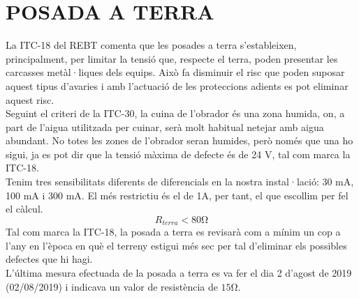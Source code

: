 \chapter{\uppercase{Posada a terra}}
La ITC-18 del REBT comenta que les posades a terra s'estableixen, principalment, per limitar la tensió que, respecte el terra, poden presentar les carcasses metàl·liques dels equips. Això fa disminuir el risc que poden suposar aquest tipus d'avaries i amb l'actuació de les proteccions adients es pot eliminar aquest risc.\\
\newline Seguint el criteri de la ITC-30, la cuina de l'obrador és una zona humida, on, a part de l'aigua utilitzada per cuinar, serà molt habitual netejar amb aigua abundant. No totes les zones de l'obrador seran humides, però només que una ho sigui, ja es pot dir que la tensió màxima de defecte és de 24 V, tal com marca la ITC-18.\\
\newline Tenim tres sensibilitats diferents de diferencials en la nostra instal·lació: 30 mA, 100 mA i 300 mA. El més restrictiu és el de 1A, per tant, el que escollim per fel el càlcul. 
\begin{equation}
R_{terra} < 80 \si{\ohm}
\end{equation}
Tal com marca la ITC-18, la posada a terra es revisarà com a mínim un cop a l'any en l'època en què el terreny estigui més sec per tal d'eliminar els possibles defectes que hi hagi.\\
\newline L'última mesura efectuada de la posada a terra es va fer el dia 2 d'agost de 2019 (02/08/2019) i indicava un valor de resistència de $15$\si{\ohm}.

\clearpage